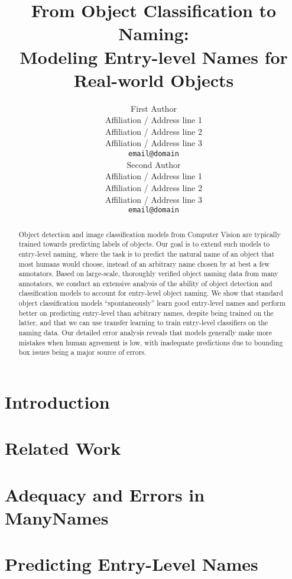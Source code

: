 \documentclass[11pt,a4paper]{article}
\title{From Object Classification to Naming:\\ Modeling Entry-level Names for Real-world Objects}
\author{First Author \\
  Affiliation / Address line 1 \\
  Affiliation / Address line 2 \\
  Affiliation / Address line 3 \\
  \texttt{email@domain} \\\And
  Second Author \\
  Affiliation / Address line 1 \\
  Affiliation / Address line 2 \\
  Affiliation / Address line 3 \\
  \texttt{email@domain} \\}
\date{}
\newcommand{\cs}[1]{\textcolor{green!60!black}{\emph{//cs: #1//}}}
\newcommand{\mn}{ManyNames\xspace}
\newcommand{\arbitrary}{arbitrary\xspace}
\begin{document}
\maketitle
\begin{abstract}
Object detection and image classification models from Computer Vision are typically trained towards predicting labels of objects. 
Our goal is to extend such models to entry-level naming, where the task is to predict the natural name of an object that most humans would choose, instead of an \arbitrary name chosen by at best a few annotators. 
Based on large-scale, thoroughly verified object naming data from many annotators, we conduct an extensive analysis of the ability of object detection and classification models to account for entry-level object naming.
We show that standard object classification models ``spontaneously'' learn good entry-level names and perform better
on predicting entry-level than \arbitrary names, despite being trained on the latter, and that we can use transfer learning to train entry-level classifiers on the naming data. 
Our detailed error analysis reveals that models generally make more mistakes when human agreement is low, with inadequate predictions due to bounding box issues being a major source of errors.
\end{abstract}

\section{Introduction}
\label{sec:intro}


\section{Related Work}
\label{sec:related}


\section{Adequacy and Errors in ManyNames}
\label{sec:manynames}


\section{Predicting Entry-Level Names}
\label{sec:experiments}

\end{document}
